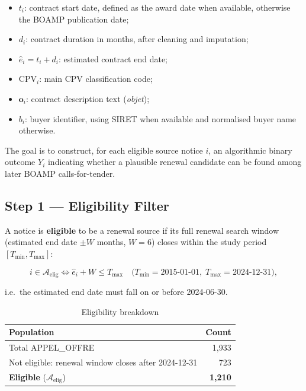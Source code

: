 \documentclass[12pt, a4paper]{article}
\begin{document}
\begin{itemize}[leftmargin=*]
  \item $t_i$: contract start date, defined as the award date when available,
        otherwise the BOAMP publication date;
  \item $d_i$: contract duration in months, after cleaning and imputation;
  \item $\hat{e}_i = t_i + d_i$: estimated contract end date;
  \item $\text{CPV}_i$: main CPV classification code;
  \item $\mathbf{o}_i$: contract description text (\textit{objet});
  \item $b_i$: buyer identifier, using SIRET when available and normalised
        buyer name otherwise.
\end{itemize}

The goal is to construct, for each eligible source notice $i$, an algorithmic
binary outcome $Y_i$ indicating whether a plausible renewal candidate can be found among later
BOAMP calls-for-tender.

\subsection{Step 1 --- Eligibility Filter}

A notice is \textbf{eligible} to be a renewal source if its full renewal search
window (estimated end date $\pm W$ months, $W=6$) closes within the study
period $[T_{\min}, T_{\max}]$:

\begin{equation}
  i \in \mathcal{A}_{\text{elig}}
  \iff
  \hat{e}_i + W \leq T_{\max}
  \quad
  \bigl(T_{\min} = \text{2015-01-01},\; T_{\max} = \text{2024-12-31}\bigr),
\end{equation}

\noindent i.e.\ the estimated end date must fall on or before 2024-06-30.

\begin{table}[h]
\centering
\caption{Eligibility breakdown}
\begin{tabular}{lr}
\toprule
Population & Count \\
\midrule
Total APPEL\_OFFRE              & 1,933 \\
Not eligible: renewal window closes after 2024-12-31 & 723 \\
\textbf{Eligible} ($\mathcal{A}_{\text{elig}}$) & \textbf{1,210} \\
\bottomrule
\end{tabular}
\end{table}
\end{document}
